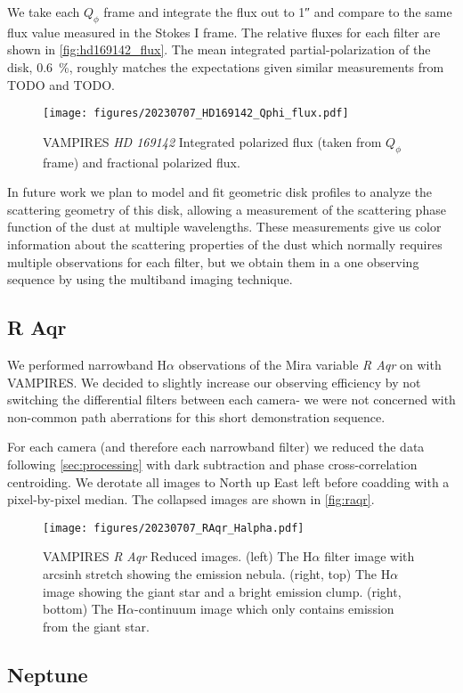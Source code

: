 We take each $Q_\phi$ frame and integrate the flux out to \ang{;;1} and compare to the same flux value measured in the Stokes I frame. The relative fluxes for each filter are shown in \autoref{fig:hd169142_flux}. The mean integrated partial-polarization of the disk, \SI{0.6}{\%}, roughly matches the expectations given similar measurements from TODO and TODO. 

\begin{figure}
    \centering
    \texttt{[image: figures/20230707\_HD169142\_Qphi\_flux.pdf]}
    \caption{ VAMPIRES \textit{HD 169142} Integrated polarized flux (taken from $Q_\phi$ frame) and fractional polarized flux.\label{fig:hd169142_flux}}
\end{figure}

In future work we plan to model and fit geometric disk profiles to analyze the scattering geometry of this disk, allowing a measurement of the scattering phase function of the dust at multiple wavelengths. These measurements give us color information about the scattering properties of the dust which normally requires multiple observations for each filter, but we obtain them in a one observing sequence by using the multiband imaging technique.

\subsection{R Aqr\label{sec:raqr}}

We performed narrowband H$\alpha$ observations of the Mira variable \textit{R Aqr} on  with VAMPIRES. We decided to slightly increase our observing efficiency by not switching the differential filters between each camera- we were not concerned with non-common path aberrations for this short demonstration sequence.

For each camera (and therefore each narrowband filter) we reduced the data following \autoref{sec:processing} with dark subtraction and phase cross-correlation centroiding. We derotate all images to North up East left before coadding with a pixel-by-pixel median. The collapsed images are shown in \autoref{fig:raqr}.

\begin{figure}
    \centering
    \texttt{[image: figures/20230707\_RAqr\_Halpha.pdf]}
    \caption{ VAMPIRES \textit{R Aqr} Reduced images. (left) The H$\alpha$ filter image with arcsinh stretch showing the emission nebula. (right, top) The H$\alpha$ image showing the giant star and a bright emission clump. (right, bottom) The H$\alpha$-continuum image which only contains emission from the giant star.\label{fig:raqr}}
\end{figure}
\subsection{Neptune\label{sec:neptune}}
